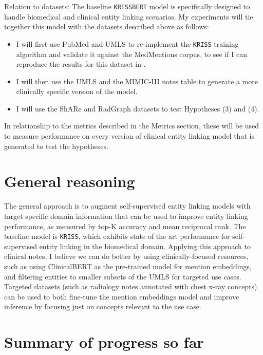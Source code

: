 \documentclass{article}
\begin{document}
Relation to datasets: The baseline \texttt{KRISSBERT} model is specifically designed to handle biomedical and clinical entity linking scenarios. My experiments will tie together this model with the datasets described above as follows:

\begin{itemize}
  \item I will first use PubMed and UMLS to re-implement the \texttt{KRISS} training algorithm and validate it against the MedMentions corpus, to see if I can reproduce the results for this dataset in \cite{zhang_knowledge-rich_2022}.
  \item I will then use the UMLS and the MIMIC-III notes table to generate a more clinically specific version of the model.
  \item I will use the ShARe and RadGraph datasets to test Hypotheses (3) and (4).
\end{itemize}

In relationship to the metrics described in the Metrics section, these will be used to measure performance on every version of clinical entity linking model that is generated to test the hypotheses.

\section{General reasoning}

The general approach is to augment self-supervised entity linking models with target specific domain information that can be used to improve entity linking performance, as measured by top-K accuracy and mean reciprocal rank. The baseline model is \texttt{KRISS}, which exhibits state of the art performance for self-supervised entity linking in the biomedical domain. Applying this approach to clinical notes, I believe we can do better by using clinically-focused resources, such as using ClinicalBERT \cite{huang_clinicalbert_2020} as the pre-trained model for mention embeddings, and filtering entities to smaller subsets of the UMLS for targeted use cases. Targeted datasets (such as radiology notes annotated with chest x-ray concepts) can be used to both fine-tune the mention embeddings model and improve inference by focusing just on concepts relevant to the use case.

\section{Summary of progress so far}
\end{document}
